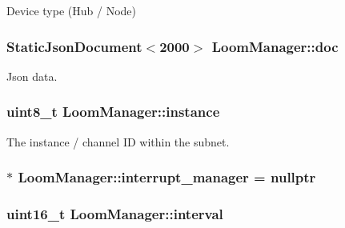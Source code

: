 Device type (Hub / Node) 

\subsubsection[{\texorpdfstring{doc}{doc}}]{\setlength{\rightskip}{0pt plus 5cm}Static\+Json\+Document$<$2000$>$ Loom\+Manager\+::doc\hspace{0.3cm}{\ttfamily [protected]}}\hypertarget{class_loom_manager_ac1b761a5c37d853db374c13a1cb3226c}{}\label{class_loom_manager_ac1b761a5c37d853db374c13a1cb3226c}


Json data. 

\subsubsection[{\texorpdfstring{instance}{instance}}]{\setlength{\rightskip}{0pt plus 5cm}uint8\+\_\+t Loom\+Manager\+::instance\hspace{0.3cm}{\ttfamily [protected]}}\hypertarget{class_loom_manager_af2ce718d7f1d10bdd48344acabf47488}{}\label{class_loom_manager_af2ce718d7f1d10bdd48344acabf47488}


The instance / channel ID within the subnet. 

\subsubsection[{\texorpdfstring{interrupt\+\_\+manager}{interrupt_manager}}]{$\ast$ Loom\+Manager\+::interrupt\+\_\+manager = nullptr\hspace{0.3cm}{\ttfamily [protected]}}\hypertarget{class_loom_manager_a9e706e9a8e7acdd2a92ef77121921a0c}{}\label{class_loom_manager_a9e706e9a8e7acdd2a92ef77121921a0c}
\subsubsection[{\texorpdfstring{interval}{interval}}]{\setlength{\rightskip}{0pt plus 5cm}uint16\+\_\+t Loom\+Manager\+::interval\hspace{0.3cm}{\ttfamily [protected]}}\hypertarget{class_loom_manager_af5742e2169b750d8b4221778e5c9f629}{}\label{class_loom_manager_af5742e2169b750d8b4221778e5c9f629}


